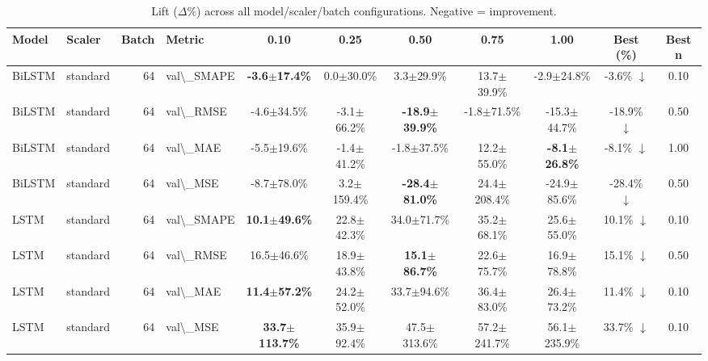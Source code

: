 \begin{table}[t]
\centering
\caption{Lift ($\Delta\%$) across all model/scaler/batch configurations. Negative = improvement.}
\label{tab:lift}
\begin{tabular}{l l r l c c c c c c c}
\toprule
Model & Scaler & Batch & Metric & 0.10 & 0.25 & 0.50 & 0.75 & 1.00 & Best (\%) & Best n \\
\midrule
BiLSTM & standard & 64 & val\textbackslash{}_SMAPE & \textbf{-3.6$\pm$17.4\%} & 0.0$\pm$30.0\% & 3.3$\pm$29.9\% & 13.7$\pm$39.9\% & -2.9$\pm$24.8\% & -3.6\% $\downarrow$ & 0.10 \\
BiLSTM & standard & 64 & val\textbackslash{}_RMSE & -4.6$\pm$34.5\% & -3.1$\pm$66.2\% & \textbf{-18.9$\pm$39.9\%} & -1.8$\pm$71.5\% & -15.3$\pm$44.7\% & -18.9\% $\downarrow$ & 0.50 \\
BiLSTM & standard & 64 & val\textbackslash{}_MAE & -5.5$\pm$19.6\% & -1.4$\pm$41.2\% & -1.8$\pm$37.5\% & 12.2$\pm$55.0\% & \textbf{-8.1$\pm$26.8\%} & -8.1\% $\downarrow$ & 1.00 \\
BiLSTM & standard & 64 & val\textbackslash{}_MSE & -8.7$\pm$78.0\% & 3.2$\pm$159.4\% & \textbf{-28.4$\pm$81.0\%} & 24.4$\pm$208.4\% & -24.9$\pm$85.6\% & -28.4\% $\downarrow$ & 0.50 \\
LSTM & standard & 64 & val\textbackslash{}_SMAPE & \textbf{10.1$\pm$49.6\%} & 22.8$\pm$42.3\% & 34.0$\pm$71.7\% & 35.2$\pm$68.1\% & 25.6$\pm$55.0\% & 10.1\% $\downarrow$ & 0.10 \\
LSTM & standard & 64 & val\textbackslash{}_RMSE & 16.5$\pm$46.6\% & 18.9$\pm$43.8\% & \textbf{15.1$\pm$86.7\%} & 22.6$\pm$75.7\% & 16.9$\pm$78.8\% & 15.1\% $\downarrow$ & 0.50 \\
LSTM & standard & 64 & val\textbackslash{}_MAE & \textbf{11.4$\pm$57.2\%} & 24.2$\pm$52.0\% & 33.7$\pm$94.6\% & 36.4$\pm$83.0\% & 26.4$\pm$73.2\% & 11.4\% $\downarrow$ & 0.10 \\
LSTM & standard & 64 & val\textbackslash{}_MSE & \textbf{33.7$\pm$113.7\%} & 35.9$\pm$92.4\% & 47.5$\pm$313.6\% & 57.2$\pm$241.7\% & 56.1$\pm$235.9\% & 33.7\% $\downarrow$ & 0.10 \\
\bottomrule
\end{tabular}
\end{table}